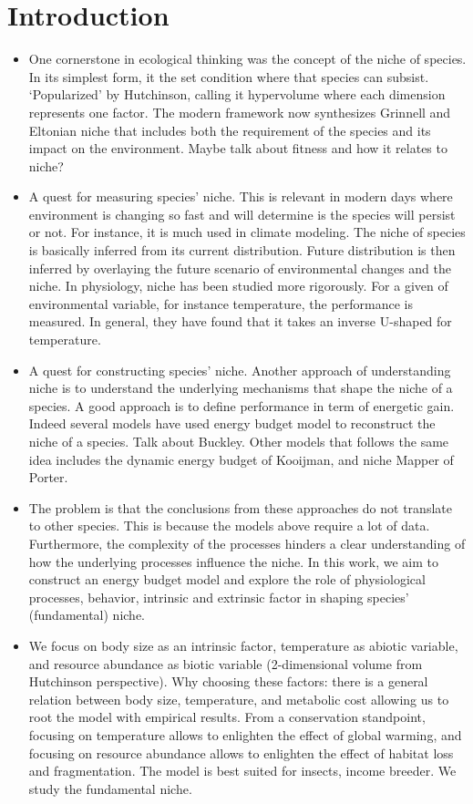 \section*{Introduction}
\begin{itemize}
\item
One  cornerstone in ecological thinking was the concept of the niche of species.
In its simplest form, it the set condition where that species can subsist.
`Popularized' by Hutchinson, calling it hypervolume where each dimension represents one factor. 
The modern framework now synthesizes Grinnell and Eltonian niche that includes both the requirement of the species and its impact on the environment.
Maybe talk about fitness and how it relates to niche?
%
\item A quest for measuring species' niche.
This is relevant in modern days where environment is changing so fast and will determine is the species will persist or not.  
For instance, it is much used in climate modeling.
The niche of species is basically inferred from its current distribution.
Future distribution is then inferred by overlaying the future scenario of environmental changes and the niche.
In physiology, niche has been studied more rigorously. 
For a given of environmental variable, for instance temperature, the performance is measured.
In general, they have found that it takes an inverse U-shaped for temperature.

\item A quest for constructing species' niche.
Another approach of understanding niche is to understand the underlying mechanisms that shape the niche of a species.
A good approach is to define performance in term of energetic gain.
Indeed several models have used energy budget model to reconstruct the niche of a species.
Talk about Buckley.
Other models that follows the same idea includes the dynamic energy budget of Kooijman, and niche Mapper of Porter.

\item The problem is that the conclusions from these approaches do not translate to other species.
This is because the models above require a lot of data.
Furthermore, the complexity of the processes hinders a clear understanding of how the underlying processes influence the niche.
In this work, we aim to construct an energy budget model and explore the role of physiological processes, behavior, intrinsic and extrinsic factor in shaping species' (fundamental) niche.

\item We focus on body size as an intrinsic factor,  temperature as abiotic variable, and resource abundance as biotic variable (2-dimensional volume from Hutchinson perspective).
Why choosing these factors: there is a general relation between body size, temperature, and metabolic cost allowing us to root the model with empirical results.
From a conservation standpoint, focusing on temperature allows to enlighten the effect of global warming, and focusing on resource abundance allows to enlighten the effect of habitat loss and fragmentation.
The model is best suited for insects, income breeder.
We study the fundamental niche.
\end{itemize}

